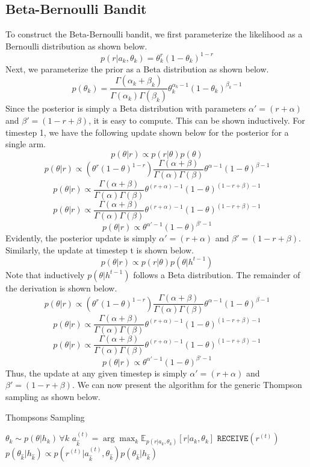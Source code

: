 \documentclass[11pt]{article}
\begin{document}
\subsection{Beta-Bernoulli Bandit}
To construct the Beta-Bernoulli bandit, we first parameterize the likelihood as a Bernoulli distribution as shown below.
\[p(r|a_k,\theta_k) = \theta^r_k(1-\theta_k)^{1-r}\] Next, we parameterize the prior as a Beta distribution as shown below.
\[p(\theta_k) = \frac{\Gamma(\alpha_k + \beta_k)}{\Gamma(\alpha_k)\Gamma(\beta_k)}\theta_k^{\alpha_k-1}(1-\theta_k)^{\beta_k-1}\] 
Since the posterior is simply a Beta distribution with parameters $\alpha' = (r+\alpha)$ and $\beta' = (1-r+\beta)$, it is easy to compute. This can be shown inductively. For timestep 1, we have the following update shown below for the posterior for a single arm.
\[ p(\theta|r) \propto p(r|\theta)p(\theta) \]
\[ p(\theta|r) \propto (\theta^r(1-\theta)^{1-r})\frac{\Gamma(\alpha + \beta)}{\Gamma(\alpha)\Gamma(\beta)}\theta^{\alpha-1}(1-\theta)^{\beta-1} \]
\[ p(\theta|r) \propto \frac{\Gamma(\alpha + \beta)}{\Gamma(\alpha)\Gamma(\beta)}\theta^{(r+\alpha)-1}(1-\theta)^{(1-r+\beta)-1} \]
\[ p(\theta|r) \propto \frac{\Gamma(\alpha + \beta)}{\Gamma(\alpha)\Gamma(\beta)}\theta^{(r+\alpha)-1}(1-\theta)^{(1-r+\beta)-1} \]
\[ p(\theta|r) \propto \theta^{\alpha'-1}(1-\theta)^{\beta'-1} \]
Evidently, the posterior update is simply $\alpha' = (r+\alpha)$ and $\beta' = (1-r+\beta)$.
Similarly, the update at timestep t is shown below.
\[ p(\theta|r) \propto p(r|\theta)p(\theta|h^{t-1}) \]
Note that inductively $p(\theta|h^{t-1})$ follows a Beta distribution. The remainder of the derivation is shown below.
\[ p(\theta|r) \propto (\theta^r(1-\theta)^{1-r})\frac{\Gamma(\alpha + \beta)}{\Gamma(\alpha)\Gamma(\beta)}\theta^{\alpha-1}(1-\theta)^{\beta-1} \]
\[ p(\theta|r) \propto \frac{\Gamma(\alpha + \beta)}{\Gamma(\alpha)\Gamma(\beta)}\theta^{(r+\alpha)-1}(1-\theta)^{(1-r+\beta)-1} \]
\[ p(\theta|r) \propto \frac{\Gamma(\alpha + \beta)}{\Gamma(\alpha)\Gamma(\beta)}\theta^{(r+\alpha)-1}(1-\theta)^{(1-r+\beta)-1} \]
\[ p(\theta|r) \propto \theta^{\alpha'-1}(1-\theta)^{\beta'-1} \]
Thus, the update at any given timestep is simply $\alpha' = (r+\alpha)$ and $\beta' = (1-r+\beta)$. We can now present the algorithm for the generic Thompson sampling as shown below.
\begin{algorithm}[H]
\caption{Thompsons Sampling}
\begin{algorithmic}[1]
    \STATE $\theta_k \sim p(\theta|h_k)\, \forall k$
    \STATE $a_{\hat{k}}^{(t)} = \arg\max_k \mathbb{E}_{p(r|a_k,\theta_k)}[r|a_k,\theta_k]$
    \STATE $\texttt{RECEIVE}(r^{(t)})$
    \STATE $p(\theta_{\hat{k}}|h_{\hat{k}}) \propto p(r^{(t)}|a^{(t)}_{\hat{k}},\theta_{\hat{k}})p(\theta_{\hat{k}}|h_{\hat{k}})$
\ENDFOR
\end{algorithmic}
\end{algorithm}
\end{document}
